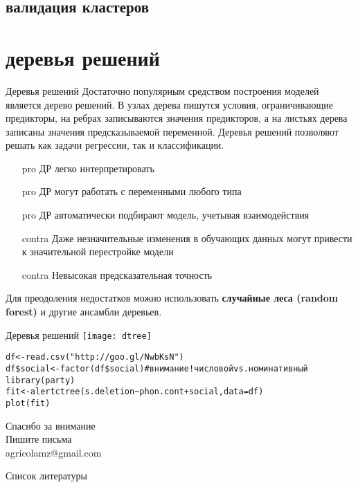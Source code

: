 \subsection{валидация кластеров}
\section{деревья решений}
\begin{frame}{Деревья решений}
Достаточно популярным средством построения моделей является дерево решений. В узлах дерева пишутся условия, ограничивающие предикторы, на ребрах записываются значения предикторов, а на листьях дерева записаны значения предсказываемой переменной. Деревья решений позволяют решать как задачи регрессии, так и классификации.
\vspace{-3mm}
\begin{multicols}{2}
\begin{itemize}
\item[pro]  ДР легко интерпретировать
\item[pro] ДР могут работать с переменными любого типа
\item[pro] ДР автоматически подбирают модель, учетывая взаимодействия
\columnbreak
\item[contra] Даже незначительные изменения в обучающих данных могут привести к значительной перестройке модели
\item[contra] Невысокая предсказательная точность
\end{itemize}
\end{multicols}
Для преодоления недостатков можно использовать \textbf{случайные леса (random forest)} и другие ансамбли деревьев.
\end{frame}
\begin{frame}{Деревья решений}
\texttt{[image: dtree]}\\
\scriptsize
\begin{alltt}
df <- read.csv("http://goo.gl/NwbKsN") \\
df\$social <- \alert{factor(df\$social) \hfill \# внимание! числовой vs. номинативный}\medskip\\
\alert{library(party)} \\
fit <- alert{ctree(}s.deletion\textasciitilde phon.cont+social, data=df\alert{)}\\
plot(fit)
\end{alltt}
\normalsize
\end{frame}
\begin{frame}
{\huge Спасибо за внимание\bigskip\\
\normalsize Пишите письма\\
agricolamz@gmail.com
\vspace{-130pt}}
\end{frame}
\begin{frame}{Список литературы}
\footnotesize


\end{frame}
